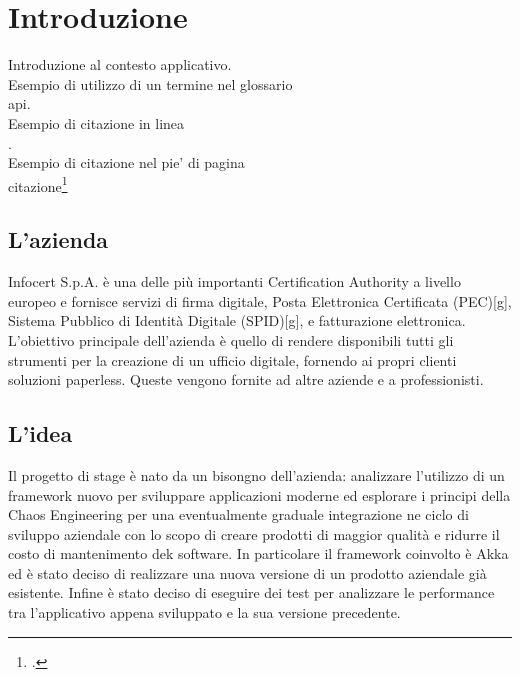 
\chapter{Introduzione}
\label{cap:introduzione}

Introduzione al contesto applicativo.\\

\noindent Esempio di utilizzo di un termine nel glossario \\
\gls{api}. \\

\noindent Esempio di citazione in linea \\
\cite{site:agile-manifesto}. \\

\noindent Esempio di citazione nel pie' di pagina \\
citazione\footcite{womak:lean-thinking} \\

\section{L'azienda}

Infocert S.p.A. è una delle più importanti Certification Authority a livello europeo
e fornisce servizi di firma digitale, Posta Elettronica Certificata (PEC)[g], Sistema
Pubblico di Identità Digitale (SPID)[g], e fatturazione elettronica. L’obiettivo principale
dell’azienda è quello di rendere disponibili tutti gli strumenti per la creazione di un
ufficio digitale, fornendo ai propri clienti soluzioni paperless. Queste vengono fornite
ad altre aziende e a professionisti.

\section{L'idea}

Il progetto di stage è nato da un bisongno dell'azienda: analizzare l'utilizzo di un framework nuovo per sviluppare applicazioni moderne ed esplorare i principi della Chaos Engineering per una eventualmente graduale integrazione ne ciclo di sviluppo aziendale con lo scopo di creare prodotti di maggior qualità e ridurre il costo di mantenimento dek software.
In particolare il framework coinvolto è Akka ed è stato deciso di realizzare una nuova versione di un prodotto aziendale già esistente.
Infine è stato deciso di eseguire dei test per analizzare le performance tra l'applicativo appena sviluppato e la sua versione precedente.

